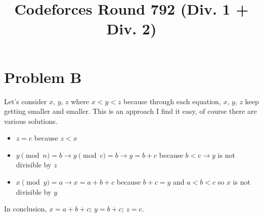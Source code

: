 \documentclass{article}
\begin{document}
\title{Codeforces Round 792 (Div. 1 + Div. 2)}
\maketitle
\section{Problem B}
Let's consider $x$, $y$, $z$ where $x<y<z$ because through each equation, $x$, $y$, $z$ keep getting smaller and smaller. This is an approach I find it easy, of course there are various solutions.
\begin{itemize}
    \item $z=c$ because $z<x$
    \item $y\pmod{n}=b\rightarrow y\pmod{c}=b\rightarrow y=b+c$ because $b<c\rightarrow y$ is not divisible by $z$
    \item $x\pmod{y}=a\rightarrow x=a+b+c$ because $b+c=y$ and $a<b<c$ so $x$ is not divisible by $y$
\end{itemize}
In conclusion, $x=a+b+c$; $y=b+c$; $z=c$.
\end{document}
